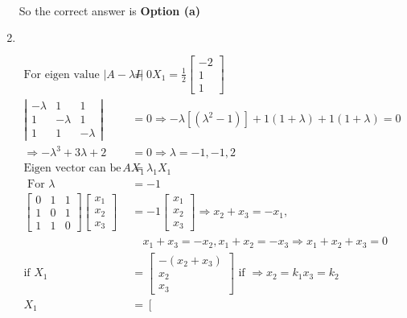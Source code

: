 \begin{enumerate}
\begin{answer}
\begin{align*}
		\end{align*}
		So the correct answer is \textbf{Option (a)}
	\end{answer}
	\item $\left. \right. $
	\begin{answer}
		\begin{align*}
		\text{For eigen value }|A-\lambda I|&=0
		X_{1}=\frac{1}{2}\left[\begin{array}{c}-2 \\ 1 \\ 1\end{array}\right]\\
		\left|\begin{array}{ccc}-\lambda & 1 & 1 \\ 1 & -\lambda & 1 \\ 1 & 1 & -\lambda\end{array}\right|&=0 \Rightarrow-\lambda\left[\left(\lambda^{2}-1\right)\right]+1(1+\lambda)+1(1+\lambda)=0\\
		\Rightarrow-\lambda^{3}+3 \lambda+2&=0 \Rightarrow \lambda=-1,-1,2\\
		\text{Eigen vector can be determine by }A X_{1}&=\lambda_{1} X_{1}\\
	\text{	For }\lambda&=-1\\
	\left[\begin{array}{lll}0 & 1 & 1 \\ 1 & 0 & 1 \\ 1 & 1 & 0\end{array}\right]\left[\begin{array}{l}x_{1} \\ x_{2} \\ x_{3}\end{array}\right]&=-1\left[\begin{array}{c}x_{1} \\ x_{2} \\ x_{3}\end{array}\right] \Rightarrow x_{2}+x_{3}=-x_{1}, \\
	&\quad x_{1}+x_{3}=-x_{2}, x_{1}+x_{2}=-x_{3} \Rightarrow x_{1}+x_{2}+x_{3}=0\\
	\text{if }X_{1}&=\left[\begin{array}{c}-\left(x_{2}+x_{3}\right) \\ x_{2} \\ x_{3}\end{array}\right]\text{ if }\Rightarrow x_{2}=k_{1} x_{3}=k_{2}\\
	X_{1}&=\left[\begin{array}{c}

\end{array}
\end{align*}
\end{answer}
\end{enumerate}
